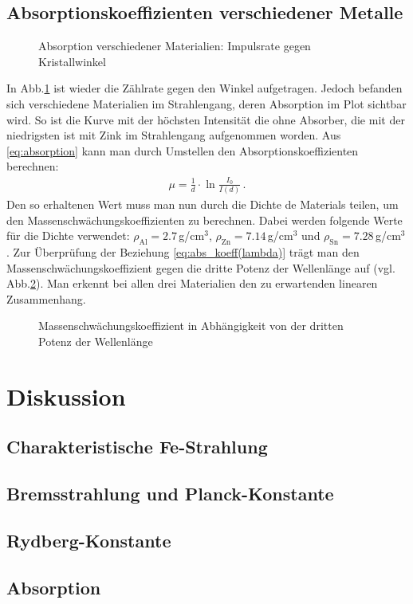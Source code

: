 \documentclass[12pt,a4paper,titlepage,headinclude,bibtotoc]{scrartcl}
\begin{document}
\subsection{Absorptionskoeffizienten verschiedener Metalle}
\begin{figure}[!htb]
	\centering
	
	\caption{Absorption verschiedener Materialien: Impulsrate gegen Kristallwinkel}
	\label{fig:messung5}
\end{figure}
In Abb.\ref{fig:messung5} ist wieder die Zählrate gegen den Winkel aufgetragen.
Jedoch befanden sich verschiedene Materialien im Strahlengang, deren Absorption im Plot sichtbar wird.
So ist die Kurve mit der höchsten Intensität die ohne Absorber, die mit der niedrigsten ist mit Zink im Strahlengang aufgenommen worden.
Aus \eqref{eq:absorption} kann man durch Umstellen den Absorptionskoeffizienten berechnen:
\begin{align}
	\mu=\frac{1}{d}\cdot\ln\frac{I_0}{I(d)}\,.
\end{align}
Den so erhaltenen Wert muss man nun durch die Dichte de Materials teilen, um den Massenschwächungskoeffizienten zu berechnen.
Dabei werden folgende Werte für die Dichte verwendet: $\rho_\text{Al}=2.7\,$g/cm$^3$, $\rho_\text{Zn}=7.14\,$g/cm$^3$ und $\rho_\text{Sn}=7.28\,$g/cm$^3$.
Zur Überprüfung der Beziehung \eqref{eq:abs_koeff(lambda)} trägt man den Massenschwächungskoeffizient gegen die dritte Potenz der Wellenlänge auf (vgl. Abb.\ref{fig:abs_koeff(lambda)}).
Man erkennt bei allen drei Materialien den zu erwartenden linearen Zusammenhang.
\begin{figure}[!htb]
	\centering
	
	\caption{Massenschwächungskoeffizient in Abhängigkeit von der dritten Potenz der Wellenlänge}
	\label{fig:abs_koeff(lambda)}
\end{figure}

\section{Diskussion}
\label{sec:diskussion}
\subsection{Charakteristische Fe-Strahlung}
\subsection{Bremsstrahlung und Planck-Konstante}

\subsection{Rydberg-Konstante}
\subsection{Absorption}



\end{document}
